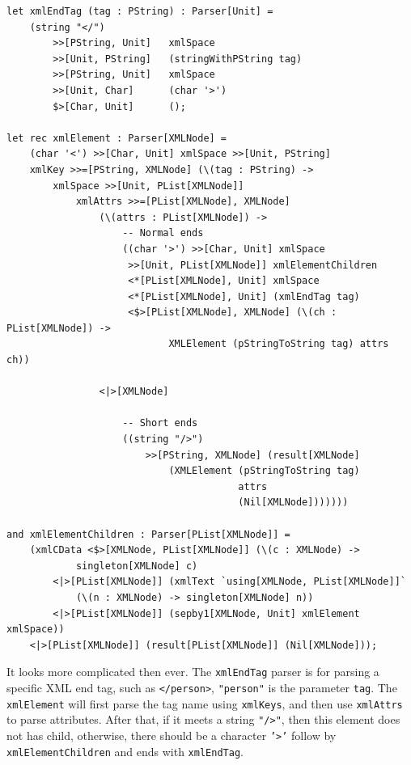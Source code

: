 \begin{lstlisting}
let xmlEndTag (tag : PString) : Parser[Unit] =
    (string "</")
        >>[PString, Unit]   xmlSpace
        >>[Unit, PString]   (stringWithPString tag)
        >>[PString, Unit]   xmlSpace
        >>[Unit, Char]      (char '>')
        $>[Char, Unit]      ();

let rec xmlElement : Parser[XMLNode] =
    (char '<') >>[Char, Unit] xmlSpace >>[Unit, PString]
    xmlKey >>=[PString, XMLNode] (\(tag : PString) ->
        xmlSpace >>[Unit, PList[XMLNode]]
            xmlAttrs >>=[PList[XMLNode], XMLNode]
                (\(attrs : PList[XMLNode]) ->
                    -- Normal ends
                    ((char '>') >>[Char, Unit] xmlSpace
                     >>[Unit, PList[XMLNode]] xmlElementChildren
                     <*[PList[XMLNode], Unit] xmlSpace
                     <*[PList[XMLNode], Unit] (xmlEndTag tag)
                     <$>[PList[XMLNode], XMLNode] (\(ch : PList[XMLNode]) ->
                            XMLElement (pStringToString tag) attrs ch))

                <|>[XMLNode]

                    -- Short ends
                    ((string "/>")
                        >>[PString, XMLNode] (result[XMLNode]
                            (XMLElement (pStringToString tag)
                                        attrs
                                        (Nil[XMLNode]))))))

and xmlElementChildren : Parser[PList[XMLNode]] =
    (xmlCData <$>[XMLNode, PList[XMLNode]] (\(c : XMLNode) ->
            singleton[XMLNode] c)
        <|>[PList[XMLNode]] (xmlText `using[XMLNode, PList[XMLNode]]`
            (\(n : XMLNode) -> singleton[XMLNode] n))
        <|>[PList[XMLNode]] (sepby1[XMLNode, Unit] xmlElement xmlSpace))
    <|>[PList[XMLNode]] (result[PList[XMLNode]] (Nil[XMLNode]));
\end{lstlisting}

It looks more complicated then ever. The \texttt{xmlEndTag} parser is for parsing a specific XML end tag, such as \texttt{</person>}, \texttt{"person"} is the parameter \texttt{tag}. The \texttt{xmlElement} will first parse the tag name using \texttt{xmlKeys}, and then use \texttt{xmlAttrs} to parse attributes. After that, if it meets a string \texttt{"/>"}, then this element does not has child, otherwise, there should be a character \texttt{'\textgreater'} follow by \texttt{xmlElementChildren} and ends with \texttt{xmlEndTag}.

